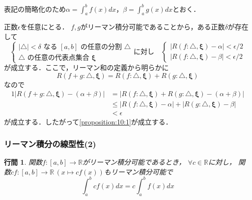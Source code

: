 \documentclass[uplatex]{jsarticle}
\makeatletter
\renewenvironment{proof}[1][\proofname]{\par
        \pushQED{\qed}
        \normalfont
        \topsep6\p@\@plus6\p@ \trivlist
        \item[\hskip\labelsep{\bfseries #1}\@addpunct{\bfseries}]\ignorespaces
    }{%
        \popQED\endtrivlist\@endpefalse
    }
\renewcommand{\proofname}{\underline{証明.}}
\newtheorem{proposition}{行間}
\makeatother
\begin{document}
\begin{proof}
    表記の簡略化のため$\alpha = \int_a^b f(x) dx$，$\beta = \int_a^b g(x) dx$とおく．

    正数$\epsilon$を任意にとる．
    $f, g$がリーマン積分可能であることから，ある正数$\delta$が存在して
    \begin{equation}
        \nonumber
        \begin{cases}
            |\triangle| < \delta \mbox{ なる } [a, b] \mbox{ の任意の分割 } \triangle \\
            \triangle \mbox{ の任意の代表点集合 } \mathbf{\xi}
        \end{cases}
        \mbox{に対し} \quad
        \begin{cases}
            |R(f: \triangle, \mathbf{\xi}) - \alpha| < \epsilon / 2 \\
            |R(f: \triangle, \mathbf{\xi}) - \beta | < \epsilon / 2
        \end{cases}
    \end{equation}
    が成立する．ここで，リーマン和の定義から明らかに
    \begin{equation}
        R(f + g: \triangle, \mathbf{\xi}) = R(f: \triangle, \mathbf{\xi}) + R(g: \triangle, \mathbf{\xi})
    \end{equation}
    なので
    \begin{alignat}{1}
        |R(f + g: \triangle, \mathbf{\xi}) - (\alpha + \beta)|
            &= |R(f: \triangle, \mathbf{\xi}) + R(g: \triangle, \mathbf{\xi}) - (\alpha + \beta)| \\
            &\leq |R(f: \triangle, \mathbf{\xi}) - \alpha| + |R(g: \triangle, \mathbf{\xi}) - \beta| \\
            &< \epsilon
    \end{alignat}
    が成立する．したがって\cref{proposition:10:1}が成立する．
\end{proof}

\subsubsection{リーマン積分の線型性(2)}

\begin{screen}
    \begin{proposition}
        関数$f:[a,b]\rightarrow\mathbb{R}$がリーマン積分可能であるとき，
        $\forall c \in \mathbb{R}$に対し，
        関数$cf: [a,b] \rightarrow \mathbb{R} \, (x \mapsto cf(x))$もリーマン積分可能で
        \begin{equation}
            \int_a^b cf(x) dx = c \int_a^b f(x) dx
            \label{proposition:10:2}
        \end{equation}
    \end{proposition}
\end{screen}
\end{document}
